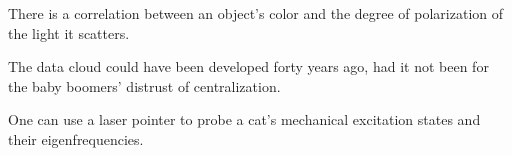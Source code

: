 \documentclass[10pt]{stellingen}
\newcommand\smallcaps[1]{{\scshape\MakeTextLowercase{#1}}}
\begin{document}
\begin{stelling}
There is a correlation between an object's color and the degree of polarization of the light it scatters.
\end{stelling}



\begin{stelling}
The data cloud could have been developed forty years ago, had it not been for the baby boomers' distrust of centralization.
\end{stelling}

\begin{stelling}
One can use a laser pointer to probe a cat's mechanical excitation states and their eigenfrequencies.
\end{stelling}


\end{document}
